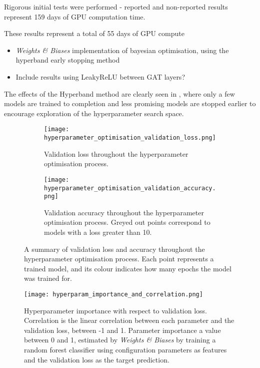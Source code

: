 Rigorous initial tests were performed - reported and non-reported results represent 159 days of GPU computation time.

These results represent a total of 55 days of GPU compute

{\color{red}
  \begin{itemize}
    \item \textit{Weights \& Biases} \cite{wandb} implementation of bayesian optimisation, using the hyperband early stopping method
    \item Include results using LeakyReLU between GAT layers?
  \end{itemize}
}



The effects of the Hyperband method are clearly seen in \figureautorefname{ \ref{fig:hyperparameter_optimisation_validation_loss_and_accuracy}}, where only a few models are trained to completion and less promising models are stopped earlier to encourage exploration of the hyperparameter search space.

\begin{figure}
    \centering
    \begin{subfigure}[t]{\textwidth}
        \texttt{[image: hyperparameter\_optimisation\_validation\_loss.png]}
        \label{fig:hyperparameter_optimisation_validation_loss}
        \caption{Validation loss throughout the hyperparameter optimisation process.}
    \end{subfigure}
    \par\bigskip %
    \par\bigskip
    \begin{subfigure}[b]{\textwidth}
        \texttt{[image: hyperparameter\_optimisation\_validation\_accuracy.png]}
        \label{fig:hyperparameter_optimisation_validation_accuracy}
        \caption{Validation accuracy throughout the hyperparameter optimisation process. Greyed out points correspond to models with a loss greater than 10.}
    \end{subfigure}
    \caption{A summary of validation loss and accuracy throughout the hyperparameter optimisation process. Each point represents a trained model, and its colour indicates how many epochs the model was trained for.}
    \label{fig:hyperparameter_optimisation_validation_loss_and_accuracy}
\end{figure}

\begin{figure}
    \centering
    \texttt{[image: hyperparam\_importance\_and\_correlation.png]}
    \caption{Hyperparameter importance with respect to validation loss. Correlation is the linear correlation between each parameter and the validation loss, between -1 and 1. Parameter importance a value between 0 and 1, estimated by \textit{Weights \& Biases} \cite{wandb} by training a random forest classifier using configuration parameters as features and the validation loss as the target prediction.}
    \label{fig:hyperparam_importance_and_correlation}
\end{figure}

